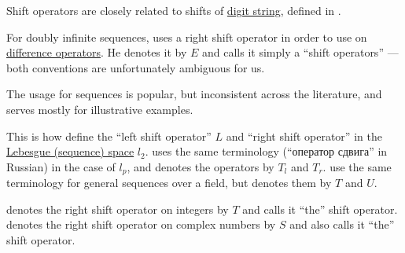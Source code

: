\begin{comments}
  \item Shift operators are closely related to shifts of \hyperref[def:positional_number_system]{digit string}, defined in .

  \item For doubly infinite sequences,  uses a right shift operator in order to use  on \hyperref[def:difference_operator]{difference operators}. He denotes it by \( E \) and calls it simply a \enquote{shift operators} --- both conventions are unfortunately ambiguous for us.

  The usage for sequences is popular, but inconsistent across the literature, and serves mostly for illustrative examples.

  This is how  define the \enquote{left shift operator} \( L \) and \enquote{right shift operator} in the \hyperref[def:lebesgue_space]{Lebesgue (sequence) space} \( l_2 \).  uses the same terminology (\enquote{оператор сдвига} in Russian) in the case of \( l_p \), and denotes the operators by \( T_l \) and \( T_r \).  use the same terminology for general sequences over a field, but denotes them by \( T \) and \( U \).

   denotes the right shift operator on integers by \( T \) and calls it \enquote{the} shift operator.  denotes the right shift operator on complex numbers by \( S \) and also calls it \enquote{the} shift operator.
\end{comments}

